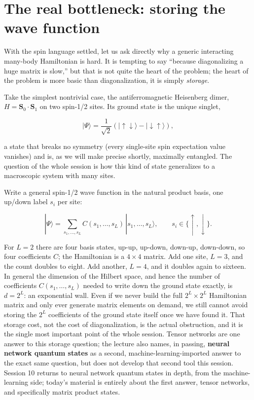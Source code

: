\section{The real bottleneck: storing the wave function}

With the spin language settled, let us ask directly why a generic interacting many-body Hamiltonian is
hard. It is tempting to say ``because diagonalizing a huge matrix is slow,'' but that is not quite the
heart of the problem; the heart of the problem is more basic than diagonalization, it is simply
\emph{storage}.

Take the simplest nontrivial case, the antiferromagnetic Heisenberg dimer, $H = \mathbf{S}_0\cdot
\mathbf{S}_1$ on two spin-1/2 sites. Its ground state is the unique singlet,

\begin{equation}
|\Psi\rangle = \frac{1}{\sqrt{2}}\left(|{\uparrow\downarrow}\rangle -
|{\downarrow\uparrow}\rangle\right),
\end{equation}

a state that breaks no symmetry (every single-site spin expectation value vanishes) and is, as we will
make precise shortly, maximally entangled. The question of the whole session is how this kind of state
generalizes to a macroscopic system with many sites.

Write a general spin-1/2 wave function in the natural product basis, one up/down label $s_i$ per site:

\begin{equation}
|\Psi\rangle = \sum_{s_1,\dots,s_L} C(s_1,\dots,s_L)\, |s_1,\dots,s_L\rangle, \qquad
s_i \in \{\uparrow,\downarrow\}.
\end{equation}

For $L=2$ there are four basis states, up-up, up-down, down-up, down-down, so four coefficients $C$;
the Hamiltonian is a $4\times4$ matrix. Add one site, $L=3$, and the count doubles to eight. Add
another, $L=4$, and it doubles again to sixteen. In general the dimension of the Hilbert space, and
hence the number of coefficients $C(s_1,\dots,s_L)$ needed to write down the ground state exactly, is
$d = 2^L$: an exponential wall. Even if we never build the full $2^L\times2^L$ Hamiltonian matrix and
only ever generate matrix elements on demand, we still cannot avoid storing the $2^L$ coefficients of
the ground state itself once we have found it. That storage cost, not the cost of diagonalization, is
the actual obstruction, and it is the single most important point of the whole session. Tensor
networks are one answer to this storage question; the lecture also names, in passing, \textbf{neural network
quantum states} as a second, machine-learning-imported answer to the exact same question, but does
not develop that second tool this session. Session 10 returns to neural network quantum states in
depth, from the machine-learning side; today's material is entirely about the first answer, tensor
networks, and specifically matrix product states.

